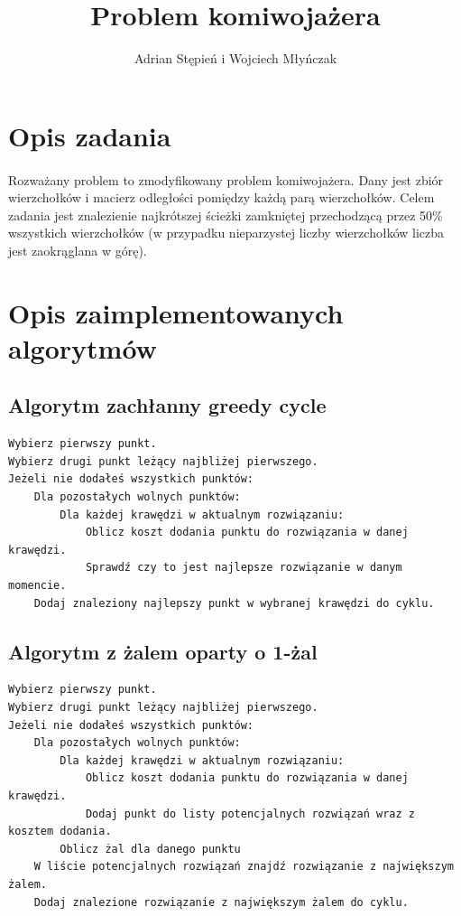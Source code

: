 \documentclass[a4paper]{article}
\title{Problem komiwojażera}
\author{Adrian Stępień i Wojciech Młyńczak}
\begin{document}
\maketitle

\section{Opis zadania}

\paragraph{}
Rozważany problem to zmodyfikowany problem komiwojażera. Dany jest zbiór wierzchołków i macierz odległości pomiędzy każdą parą wierzchołków. Celem zadania jest znalezienie najkrótszej ścieżki zamkniętej przechodzącą przez 50\% wszystkich wierzchołków (w przypadku nieparzystej liczby wierzchołków liczba jest zaokrąglana w górę).

\section{Opis zaimplementowanych algorytmów}

\subsection{Algorytm zachłanny greedy cycle}

\begin{lstlisting}
Wybierz pierwszy punkt.
Wybierz drugi punkt leżący najbliżej pierwszego.
Jeżeli nie dodałeś wszystkich punktów:
	Dla pozostałych wolnych punktów:
		Dla każdej krawędzi w aktualnym rozwiązaniu:
			Oblicz koszt dodania punktu do rozwiązania w danej krawędzi.
			Sprawdź czy to jest najlepsze rozwiązanie w danym momencie.
	Dodaj znaleziony najlepszy punkt w wybranej krawędzi do cyklu.
\end{lstlisting}

\subsection{Algorytm z żalem oparty o 1-żal}

\begin{lstlisting}
Wybierz pierwszy punkt.
Wybierz drugi punkt leżący najbliżej pierwszego.
Jeżeli nie dodałeś wszystkich punktów:
	Dla pozostałych wolnych punktów:
		Dla każdej krawędzi w aktualnym rozwiązaniu:
			Oblicz koszt dodania punktu do rozwiązania w danej krawędzi.
			Dodaj punkt do listy potencjalnych rozwiązań wraz z kosztem dodania.
		Oblicz żal dla danego punktu
	W liście potencjalnych rozwiązań znajdź rozwiązanie z największym żalem.
	Dodaj znalezione rozwiązanie z największym żalem do cyklu.
\end{lstlisting}
\end{document}
